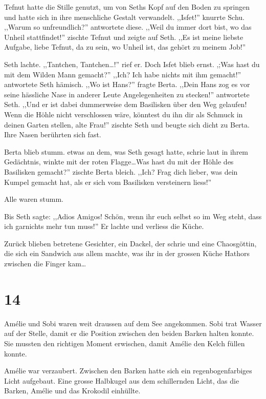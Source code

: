 Tefnut hatte die Stille genutzt, um von Seths Kopf auf den Boden zu springen und hatte sich in ihre menschliche Gestalt verwandelt. ,,Isfet!'' knurrte Schu. ,,Warum so unfreundlich?'' antwortete diese. ,,Weil du immer dort bist, wo das Unheil stattfindet!'' zischte Tefnut und zeigte auf Seth. ,,Es ist meine liebste Aufgabe, liebe Tefnut, da zu sein, wo Unheil ist, das gehört zu meinem Job!''

Seth lachte. ,,Tantchen, Tantchen\dots !'' rief er. Doch Isfet blieb ernst. ,;Was hast du mit dem Wilden Mann gemacht?'' ,,Ich? Ich habe nichts mit ihm gemacht!'' antwortete Seth hämisch. ,,Wo ist Hans?'' fragte Berta. ,,Dein Hans zog es vor seine hässliche Nase in anderer Leute Angelegenheiten zu stecken!'' antwortete Seth. ,,Und er ist dabei dummerweise dem Basilisken über den Weg gelaufen! Wenn die Höhle nicht verschlossen wäre, könntest du ihn dir als Schmuck in deinen Garten stellen, alte Frau!'' zischte Seth und beugte sich dicht zu Berta. Ihre Nasen berührten sich fast. 

Berta blieb stumm. etwas an dem, was Seth gesagt hatte, schrie laut in ihrem Gedächtnis, winkte mit der roten Flagge\dots Was hast du mit der Höhle des Basilisken gemacht?'' zischte Berta bleich. ,,Ich? Frag dich lieber, was dein Kumpel gemacht hat, als er sich vom Basilisken versteinern liess!''

Alle waren stumm. 

Bis Seth sagte: ,,Adios Amigos! Schön, wenn ihr euch selbst so im Weg steht, dass ich garnichts mehr tun muss!'' Er lachte und verliess die Küche.

Zurück blieben betretene Gesichter, ein Dackel, der schrie und eine Chaosgöttin, die sich ein Sandwich aus allem machte, was ihr in der grossen Küche Hathors zwischen die Finger kam\dots

\section*{14}

Amélie und Sobi waren weit draussen auf dem See angekommen. Sobi trat Wasser auf der Stelle, damit er die Position zwischen den beiden Barken halten konnte. Sie mussten den richtigen Moment erwischen, damit Amélie den Kelch füllen konnte.

Amélie war verzaubert. Zwischen den Barken hatte sich ein regenbogenfarbiges Licht aufgebaut. Eine grosse Halbkugel aus dem schillernden Licht, das die Barken, Amélie und das Krokodil einhüllte.


